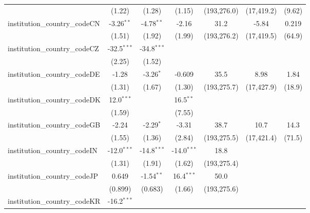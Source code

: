 \begin{tabular}{lcccccc}
                                         & (1.22)        & (1.28)        & (1.15)        & (193,276.0)   & (17,419.2)   & (9.62)\\   
   institution\_country\_codeCN          & -3.26$^{**}$  & -4.78$^{**}$  & -2.16         & 31.2          & -5.84        & 0.219\\   
                                         & (1.51)        & (1.92)        & (1.99)        & (193,276.2)   & (17,419.5)   & (64.9)\\   
   institution\_country\_codeCZ          & -32.5$^{***}$ & -34.8$^{***}$ &               &               &              &   \\   
                                         & (2.25)        & (1.52)        &               &               &              &   \\   
   institution\_country\_codeDE          & -1.28         & -3.26$^{*}$   & -0.609        & 35.5          & 8.98         & 1.84\\   
                                         & (1.31)        & (1.67)        & (1.30)        & (193,275.7)   & (17,427.9)   & (18.9)\\   
   institution\_country\_codeDK          & 12.0$^{***}$  &               & 16.5$^{**}$   &               &              &   \\   
                                         & (1.59)        &               & (7.55)        &               &              &   \\   
   institution\_country\_codeGB          & -2.24         & -2.29$^{*}$   & -3.31         & 38.7          & 10.7         & 14.3\\   
                                         & (1.55)        & (1.36)        & (2.84)        & (193,275.5)   & (17,421.4)   & (71.5)\\   
   institution\_country\_codeIN          & -12.0$^{***}$ & -14.8$^{***}$ & -14.0$^{***}$ & 18.8          &              &   \\   
                                         & (1.31)        & (1.91)        & (1.62)        & (193,275.4)   &              &   \\   
   institution\_country\_codeJP          & 0.649         & -1.54$^{**}$  & 16.4$^{***}$  & 50.0          &              &   \\   
                                         & (0.899)       & (0.683)       & (1.66)        & (193,275.6)   &              &   \\   
   institution\_country\_codeKR          & -16.2$^{***}$ &               &               &               &              &   \\   

\end{tabular}
